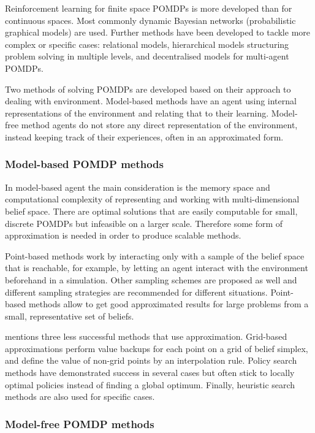 Reinforcement learning for finite space POMDPs is more developed than for
continuous spaces. Most commonly dynamic Bayesian networks (probabilistic
graphical models) are used. Further methods have been developed to tackle more
complex or specific cases: relational models, hierarchical models structuring
problem solving in multiple levels, and decentralised models for multi-agent
POMDPs. \parencite{Spaan2012ai+pomdp}

Two methods of solving POMDPs are developed based on their approach to dealing
with environment. Model-based methods have an agent using internal
representations of the environment and relating that to their learning. Model-
free method agents do not store any direct representation of the environment,
instead keeping track of their experiences, often in an approximated form.

\subsubsection{Model-based POMDP methods}
\label{sec:ai:pomdp:model:based}

In model-based agent the main consideration is the memory space and
computational complexity of representing and working with multi-dimensional
belief space. There are optimal solutions that are easily computable for small,
discrete POMDPs but infeasible on a larger scale. Therefore some form of
approximation is needed in order to produce scalable methods.
\parencite{Spaan2012ai+pomdp}

Point-based methods work by interacting only with a sample of the belief space
that is reachable, for example, by letting an agent interact with the
environment beforehand in a simulation. Other sampling schemes are proposed as
well and different sampling strategies are recommended for different
situations. Point-based methods allow to get good approximated results for
large problems from a small, representative set of beliefs.
\parencite{Spaan2012ai+pomdp}

\textcite{Spaan2012ai+pomdp} mentions three less successful methods that use
approximation. Grid-based approximations perform value backups for each point
on a grid of belief simplex, and define the value of non-grid points by an
interpolation rule. Policy search methods have demonstrated success in several
cases but often stick to locally optimal policies instead of finding a global
optimum. Finally, heuristic search methods are also used for specific cases.


\subsubsection{Model-free POMDP methods}
\label{sec:ai:pomdp:model:free}

